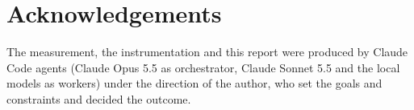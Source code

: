 \section*{Acknowledgements}

The measurement, the instrumentation and this report were produced by Claude Code agents (Claude Opus 5.5 as
orchestrator, Claude Sonnet 5.5 and the local models as workers) under the direction of the author, who set the goals
and constraints and decided the outcome.


\clearpage
{}
{}
\printbibliography[title={References}]


